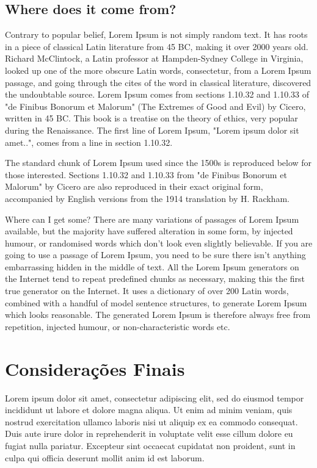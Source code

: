 \documentclass[12pt]{article}
\begin{document}
\subsection{Where does it come from?}
Contrary to popular belief, Lorem Ipsum is not simply random text. It has roots in a piece of classical Latin literature from 45 BC, making it over 2000 years old. Richard McClintock, a Latin professor at Hampden-Sydney College in Virginia, looked up one of the more obscure Latin words, consectetur, from a Lorem Ipsum passage, and going through the cites of the word in classical literature, discovered the undoubtable source. Lorem Ipsum comes from sections 1.10.32 and 1.10.33 of "de Finibus Bonorum et Malorum" (The Extremes of Good and Evil) by Cicero, written in 45 BC. This book is a treatise on the theory of ethics, very popular during the Renaissance. The first line of Lorem Ipsum, "Lorem ipsum dolor sit amet..", comes from a line in section 1.10.32.

The standard chunk of Lorem Ipsum used since the 1500s is reproduced below for those interested. Sections 1.10.32 and 1.10.33 from "de Finibus Bonorum et Malorum" by Cicero are also reproduced in their exact original form, accompanied by English versions from the 1914 translation by H. Rackham.

Where can I get some? There are many variations of passages of Lorem Ipsum available, but the majority have suffered alteration in some form, by injected humour, or randomised words which don't look even slightly believable. If you are going to use a passage of Lorem Ipsum, you need to be sure there isn't anything embarrassing hidden in the middle of text. All the Lorem Ipsum generators on the Internet tend to repeat predefined chunks as necessary, making this the first true generator on the Internet. It uses a dictionary of over 200 Latin words, combined with a handful of model sentence structures, to generate Lorem Ipsum which looks reasonable. The generated Lorem Ipsum is therefore always free from repetition, injected humour, or non-characteristic words etc.


\section{Considerações Finais}

Lorem ipsum dolor sit amet, consectetur adipiscing elit, sed do eiusmod tempor incididunt ut labore et dolore magna aliqua. Ut enim ad minim veniam, quis nostrud exercitation ullamco laboris nisi ut aliquip ex ea commodo consequat. Duis aute irure dolor in reprehenderit in voluptate velit esse cillum dolore eu fugiat nulla pariatur. Excepteur sint occaecat cupidatat non proident, sunt in culpa qui officia deserunt mollit anim id est laborum.
\end{document}
